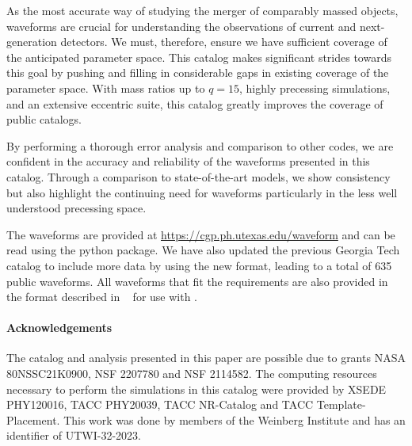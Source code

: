 \documentclass[
twocolumn,prd,
showpacs,
nofootinbib,
amsmath,amssymb,
superscriptaddress]{revtex4-1}
\begin{document}
As the most accurate way of studying the merger of comparably massed objects, \nr{} waveforms are crucial for understanding the observations of current and next-generation \gw{} detectors.
We must, therefore, ensure we have sufficient \nr{} coverage of the anticipated parameter space.
This catalog makes significant strides towards this goal by pushing and filling in considerable gaps in existing \nr{} coverage of the \bbh{} parameter space. 
With mass ratios up to $q=15$, highly precessing simulations, and an extensive eccentric suite, this catalog greatly improves the coverage of public \nr{} catalogs.

By performing a thorough error analysis and comparison to other \nr{} codes, we are confident in the accuracy and reliability of the waveforms presented in this catalog.
Through a comparison to state-of-the-art \gw{} models, we show consistency but also highlight the continuing need for \nr{} waveforms particularly in the less well understood precessing space. 

The waveforms are provided at \url{https://cgp.ph.utexas.edu/waveform} and can be read using the \mayawaves{} python package. 
We have also updated the previous Georgia Tech catalog to include more data by using the new format, leading to a total of 635 public waveforms.
All waveforms that fit the requirements are also provided in the format described in ~\cite{Schmidt:2017btt} for use with \pycbc{}. \\

\paragraph*{\textbf{Acknowledgements}}
The catalog and analysis presented in this paper are possible due to grants NASA 80NSSC21K0900, NSF 2207780 and NSF 2114582. 
The computing resources necessary to perform the simulations in this catalog were provided by XSEDE PHY120016, TACC PHY20039, TACC NR-Catalog and TACC Template-Placement.
This work was done by members of the Weinberg Institute and has an identifier of UTWI-32-2023.


%

\end{document}
